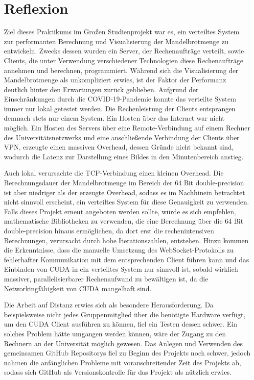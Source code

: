 \documentclass[12pt, onecolumn, notitlepage]{scrartcl}
\begin{document}
\section{Reflexion}
Ziel dieses Praktikums im Großen Studienprojekt war es, ein verteiltes System zur performanten Berechnung und Visualisierung der Mandelbrotmenge zu entwickeln. Zwecks dessen wurden ein Server, der Rechenaufträge verteilt, sowie Clients, die unter Verwendung verschiedener Technologien diese Rechenaufträge annehmen und berechnen, programmiert. Während sich die Visualisierung der Mandelbrotmenge als unkompliziert erwies, ist der Faktor der Performanz deutlich hinter den Erwartungen zurück geblieben. Aufgrund der Einschränkungen durch die COVID-19-Pandemie konnte das verteilte System immer nur lokal getestet werden. Die Rechenleistung der Clients entsprangen demnach stets nur einem System. Ein Hosten über das Internet war nicht möglich. Ein Hosten des Servers über eine Remote-Verbindung auf einem Rechner des Universitätsnetzwerks und eine anschließende Verbindung der Clients über VPN, erzeugte einen massiven Overhead, dessen Gründe nicht bekannt sind, wodurch die Latenz zur Darstellung eines Bildes in den Minutenbereich anstieg. \par 
Auch lokal verursachte die TCP-Verbindung einen kleinen Overhead. Die Berechnungsdauer der Mandelbrotmenge im Bereich der 64 Bit double-precision ist aber niedriger als der erzeugte Overhead, sodass es im Nachhinein betrachtet nicht sinnvoll erscheint, ein verteiltes System für diese Genauigkeit zu verwenden. Falls dieses Projekt erneut angeboten werden sollte, würde es sich empfehlen, mathematische Bibliotheken zu verwenden, die eine Berechnung über die 64 Bit double-precision hinaus ermöglichen, da dort erst die rechenintensiven Berechnungen, verursacht durch hohe Iterationszahlen, entstehen. Hinzu kommen die Erkenntnisse, dass die manuelle Umsetzung des WebSocket-Protokolls zu fehlerhafter Kommunikation mit dem entsprechenden Client führen kann und das Einbinden von CUDA in ein verteiltes System nur sinnvoll ist, sobald wirklich massiver, parallelisierbarer Rechenaufwand zu bewältigen ist, da die Networkingfähigkeit von CUDA mangelhaft sind. \par 
Die Arbeit auf Distanz erwies sich als besondere Herausforderung. Da beispielsweise nicht jedes Gruppenmitglied über die benötigte Hardware verfügt, um den CUDA Client ausführen zu können, fiel ein Testen dessen schwer. Ein solches Problem hätte umgangen werden können, wäre der Zugang zu den Rechnern an der Universität möglich gewesen. Das Anlegen und Verwenden des gemeinsamen GitHub Repositorys fiel zu Beginn des Projekts noch schwer, jedoch nahmen die anfänglichen Probleme mit voranschreitender Zeit des Projekts ab, sodass sich GitHub als Versionskontrolle für das Projekt als nützlich erwies.

\nocite{*}
\end{document}
